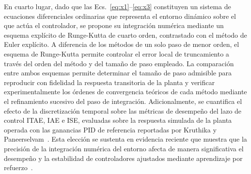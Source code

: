 \documentclass[final,5p,times,twocolumn,authoryear,11pt]{elsarticle}
\begin{document}
En cuarto lugar, dado que las Ecs.~\eqref{eq:x1}--\eqref{eq:x3} constituyen un sistema de ecuaciones diferenciales ordinarias que representa el entorno dinámico sobre el que actúa el controlador, se propone su integración numérica mediante un esquema explícito de Runge-Kutta de cuarto orden, contrastado con el método de Euler explícito. A diferencia de los métodos de un solo paso de menor orden, el esquema de Runge-Kutta permite controlar el error local de truncamiento a través del orden del método y del tamaño de paso empleado. La comparación entre ambos esquemas permite determinar el tamaño de paso admisible para reproducir con fidelidad la respuesta transitoria de la planta y verificar experimentalmente los órdenes de convergencia teóricos de cada método mediante el refinamiento sucesivo del paso de integración. Adicionalmente, se cuantifica el efecto de la discretización temporal sobre las métricas de desempeño del lazo de control ITAE, IAE e ISE, evaluadas sobre la respuesta simulada de la planta operada con las ganancias PID de referencia reportadas por Kruthika y Paneerselvam~\citep{kruthika2025novel}. Esta elección se sustenta en evidencia reciente que muestra que la precisión de la integración numérica del entorno afecta de manera significativa el desempeño y la estabilidad de controladores ajustados mediante aprendizaje por refuerzo~\citep{bajrami2026modelling}.

\clearpage
\end{document}
